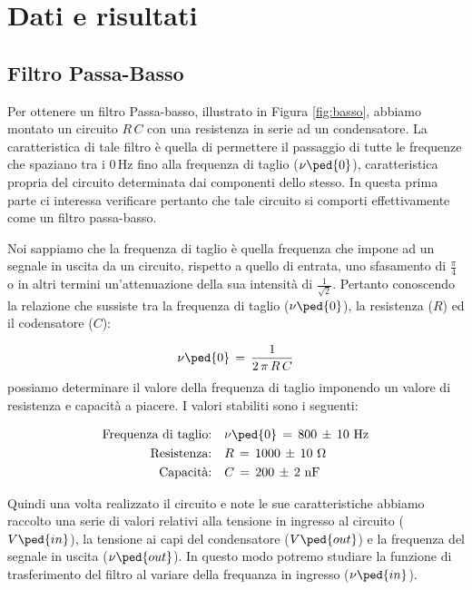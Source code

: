 \section*{Dati e risultati}

\subsection*{Filtro Passa-Basso}

Per ottenere un filtro Passa-basso, illustrato in Figura \ref{fig:basso}, abbiamo montato un circuito $R\,C$ con una resistenza in serie ad un condensatore.
La caratteristica di tale filtro è quella di permettere il passaggio di tutte le frequenze che spaziano tra i $0\,\si{\hertz}$ fino alla frequenza di taglio ($\nu\ped{0}$), caratteristica propria del circuito determinata dai componenti dello stesso.
In questa prima parte ci interessa verificare pertanto che tale circuito si comporti effettivamente come un filtro passa-basso.

Noi sappiamo che la frequenza di taglio è quella frequenza che impone ad un segnale in uscita da un circuito, rispetto a quello di entrata, uno sfasamento di $\frac{\pi}{4}$ o in altri termini un'attenuazione della sua intensità di $\frac{1}{\sqrt{2}}$.
Pertanto conoscendo la relazione che sussiste tra la frequenza di taglio ($\nu\ped{0}$), la resistenza ($R$) ed il codensatore ($C$):

\begin{equation}
	\nu\ped{0} \,=\, \frac{1}{2\,\pi\,R\,C}
	\label{eq:taglio basso}
\end{equation}
%
possiamo determinare il valore della frequenza di taglio imponendo un valore di resistenza e capacità a piacere. I valori stabiliti sono i seguenti:

\begin{align*}
	\text{Frequenza di taglio:}& \quad \nu\ped{0} \,=\, 800 \,\pm\, 10 \,\, \si{\hertz} \\
	\text{Resistenza:}& \quad R \,=\, 1000 \,\pm\, 10 \,\, \si{\ohm} \\
	\text{Capacità:}& \quad C \,=\, 200 \,\pm\, 2 \,\, \si{\nano\farad} \\
\end{align*}

Quindi una volta realizzato il circuito e note le sue caratteristiche abbiamo raccolto una serie di valori relativi alla tensione in ingresso al circuito ($V\ped{in}$), la tensione ai capi del condensatore ($V\ped{out}$) e la frequenza del segnale in uscita ($\nu\ped{out}$).
In questo modo potremo studiare la funzione di trasferimento del filtro al variare della frequanza in ingresso ($\nu\ped{in}$).


